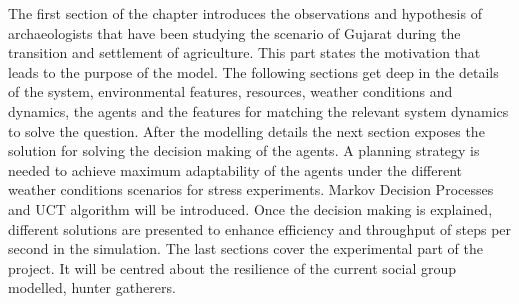 \documentclass[11pt,oneside,a4paper,openright]{report}
\begin{document}




The first section of the chapter introduces the observations and hypothesis of archaeologists that have been studying the scenario of Gujarat during the transition and settlement of agriculture. This part states the motivation that leads to the purpose of the model. The following sections get deep in the details of the system, environmental features, resources, weather conditions and dynamics, the agents and the features for matching the relevant system dynamics to solve the question. After the modelling details the next section exposes the solution for solving the decision making of the agents. A planning strategy is needed to achieve maximum adaptability of the agents under the different weather conditions scenarios for stress experiments. Markov Decision Processes and UCT algorithm will be introduced. Once the decision making is explained, different solutions are presented to enhance efficiency and throughput of steps per second in the simulation. The last sections cover the experimental part of the project. It will be centred about the resilience of the current social group modelled, hunter gatherers. %










\end{document}

